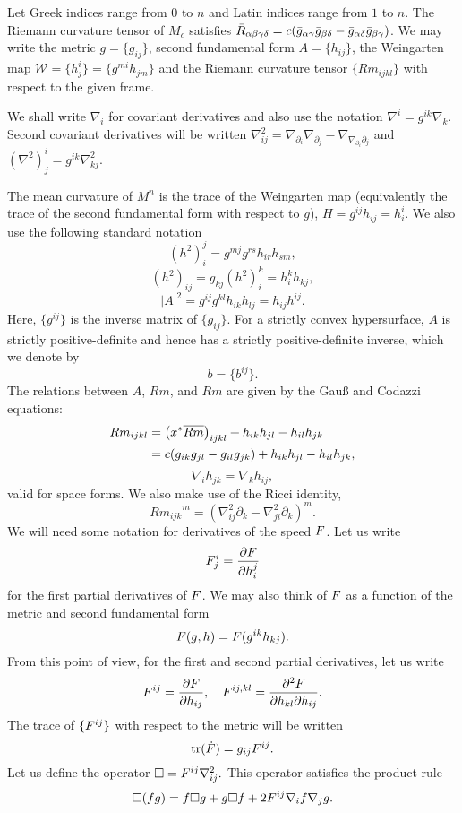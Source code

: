\documentclass{amsart}
\begin{document}
Let Greek indices range from \(0\) to \(n\) and Latin indices range from \(1\) to \(n\). The Riemann curvature tensor of \(M_c\) satisfies \(\bar{R}_{\alpha\beta\gamma\delta} = c(\bar{g}_{\alpha\gamma}\bar{g}_{\beta\delta} - \bar{g}_{\alpha\delta}\bar{g}_{\beta\gamma})\). We may write the metric $g = \{g_{ij}\}$, second fundamental form $A = \{h_{ij}\}$, the Weingarten map $\mathcal{W} = \{h^i_j\} = \{g^{mi} h_{jm}\}$ and the Riemann curvature tensor $\{Rm_{ijkl}\}$ with respect to the given frame.

We shall write \(\nabla_i\) for covariant derivatives and also use the notation \(\nabla^i = g^{ik} \nabla_k\). Second covariant derivatives will be written \(\nabla^2_{ij} = \nabla_{\partial_i} \nabla_{\partial_j} - \nabla_{\nabla_{\partial_i}\partial_j}\) and \((\nabla^2)^i_j = g^{ik} \nabla^2_{kj}\).

The mean curvature of $M^n$ is the trace of the Weingarten map (equivalently the trace of the second fundamental form with respect to $g$), $H = g^{ij}h_{ij} = h^i_i$. We also use the following standard notation
\[
(h^2)_i^j = g^{mj}g^{rs}h_{ir}h_{sm},
\]
\[
(h^2)_{ij} = g_{kj} (h^2)_i^k = h^k_i h_{kj},
\]
\[
|A|^2 = g^{ij}g^{kl}h_{ik}h_{lj} = h_{ij}h^{ij}.
\]
Here, $\{g^{ij}\}$ is the inverse matrix of $\{g_{ij}\}.$ For a strictly convex hypersurface, \(A\) is strictly positive-definite and hence has a strictly positive-definite inverse, which we denote by
\[
b = \{b^{ij}\}.
\]
The relations between $A$, $Rm$, and $\overline{Rm}$ are given by the Gau{\ss} and Codazzi equations:
\[
\begin{split}
Rm_{ijkl} &= \left(x^{*}\overline{Rm}\right)_{ijkl} + h_{ik}h_{jl} - h_{il}h_{jk} \\
&= c({g}_{ik}{g}_{jl} - {g}_{il}{g}_{jk}) + h_{ik}h_{jl} - h_{il}h_{jk},
\end{split}
\]
\[
\nabla_i h_{jk} = \nabla_k h_{ij},
\]
valid for space forms. We also make use of the Ricci identity,
\[
{{Rm}_{ijk}}^{m}  = \left(\nabla^2_{ij} \partial_k - \nabla^2_{ji} \partial_k\right)^m.
\]
We will need some notation for derivatives of the speed \(F\). Let us write
\[
F^{i}_{j} = \frac{\partial F}{\partial h^{j}_{i}}
\]
for the first partial derivatives of \(F\). We may also think of \(F\) as a function of the metric and second fundamental form
\[
F(g, h) = F(g^{ik} h_{kj}).
\]
From this point of view, for the first and second partial derivatives, let us write
\[
F^{ij} = \frac{\partial F}{\partial h_{ij}}, \quad F^{ij,kl} = \frac{\partial^2F}{\partial h_{kl} \partial h_{ij}}.
\]
The trace of $\{F^{ij}\}$ with respect to the metric will be written
\[
\operatorname{tr}(\dot{F}) = g_{ij} F^{ij}.
\]
Let us define the operator
$
\Box = F^{ij} \nabla^2_{ij}.
$
This operator satisfies the product rule
\begin{equation}
\label{eq:productbox}
\Box (fg) = f \Box g + g \Box f + 2 F^{ij} \nabla_i f \nabla_j g.
\end{equation}
\end{document}
